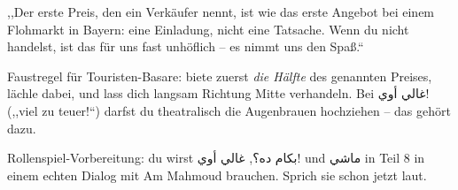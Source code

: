 \begin{ammahmoudbox}
,,Der erste Preis, den ein Verkäufer nennt, ist wie das erste Angebot bei
einem Flohmarkt in Bayern: eine Einladung, nicht eine Tatsache. Wenn du
nicht handelst, ist das für uns fast unhöflich -- es nimmt uns den Spaß.``
\end{ammahmoudbox}

\begin{tippbox}
Faustregel für Touristen-Basare: biete zuerst \emph{die Hälfte} des
genannten Preises, lächle dabei, und lass dich langsam Richtung Mitte
verhandeln. Bei \textarabic{غالي أوي!} (,,viel zu teuer!``) darfst du
theatralisch die Augenbrauen hochziehen -- das gehört dazu.
\end{tippbox}

\begin{checkpointbox}
Rollenspiel-Vorbereitung: du wirst \textarabic{بكام ده؟},
\textarabic{غالي أوي!} und \textarabic{ماشي} in Teil 8 in einem echten
Dialog mit Am Mahmoud brauchen. Sprich sie schon jetzt laut.
\end{checkpointbox}
